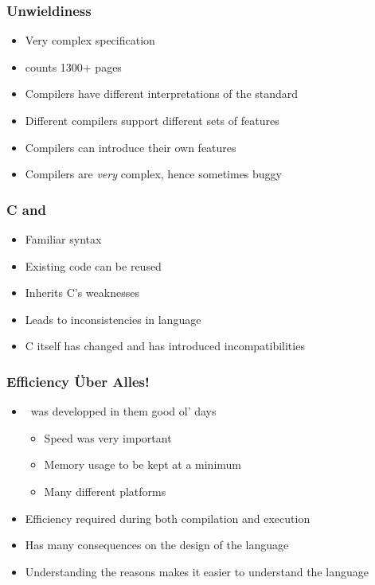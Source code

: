 \documentclass{../ucll-slides}
\begin{document}
\begin{frame}
  \frametitle{Unwieldiness}
  \begin{itemize}
    \item Very complex specification
    \item {}
          counts 1300+ pages 
    \item Compilers have different interpretations of the standard
    \item Different compilers support different sets of features
    \item Compilers can introduce their own features
    \item Compilers are \emph{very} complex, hence sometimes buggy
  \end{itemize}
\end{frame}

\begin{frame}
  \frametitle{C and \cpp}
  \begin{itemize}
    \item Familiar syntax
    \item Existing code can be reused
  \end{itemize}
  \vskip5mm
  \begin{itemize}
    \item Inherits C's weaknesses
    \item Leads to inconsistencies in language
  \end{itemize}
  \vskip5mm
  \begin{itemize}
    \item C itself has changed and has introduced incompatibilities
  \end{itemize}
\end{frame}

\begin{frame}
  \frametitle{Efficiency \"Uber Alles!}
  \begin{itemize}
    \item \cpp\ was developped in them good ol' days
          \begin{itemize}
            \item Speed was very important
            \item Memory usage to be kept at a minimum
            \item Many different platforms
          \end{itemize}
    \item Efficiency required during both compilation and execution
    \item Has many consequences on the design of the language
    \item Understanding the reasons makes it easier to understand the language
  \end{itemize}
\end{frame}
\end{document}
